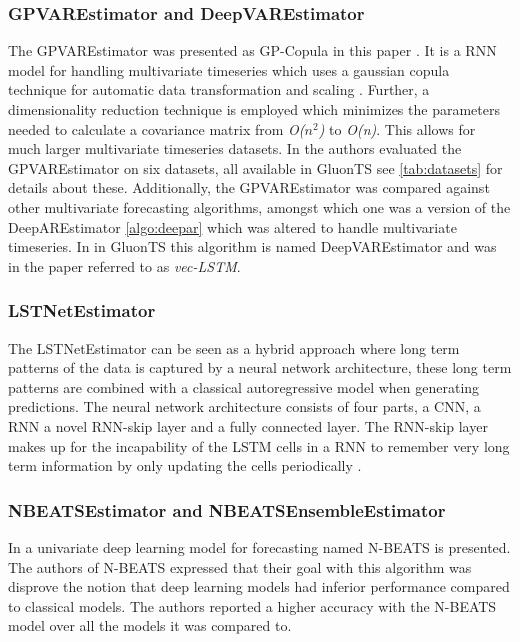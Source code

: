 \subsubsection{GPVAREstimator and DeepVAREstimator}
\label{algo:gpvar}
The GPVAREstimator was presented as GP-Copula in this paper \cite{salinas_high-dimensional_2019}. It is a RNN model for handling multivariate timeseries which uses a gaussian copula technique for automatic data transformation and scaling . Further, a dimensionality reduction technique is employed which minimizes the parameters needed to calculate a covariance matrix from \textit{O($n^2$)} to \textit{O(n)}. This allows for much larger multivariate timeseries datasets. In \cite{salinas_high-dimensional_2019} the authors evaluated the GPVAREstimator on six datasets, all available in GluonTS see \ref{tab:datasets} for details about these. Additionally, the GPVAREstimator was compared against other multivariate forecasting algorithms, amongst which one was a version of the DeepAREstimator \ref{algo:deepar} which was altered to handle multivariate timeseries. In in GluonTS this algorithm is named DeepVAREstimator and was in the paper referred to as \textit{vec-LSTM}. 

\subsubsection{LSTNetEstimator}
The LSTNetEstimator can be seen as a hybrid approach where long term patterns of the data is captured by a neural network architecture, these long term patterns are combined with a classical autoregressive model when generating predictions. The neural network architecture consists of four parts, a CNN, a RNN a novel RNN-skip layer and a fully connected layer. The RNN-skip layer makes up for the incapability of the LSTM cells in a RNN to remember very long term information by only updating the cells periodically \cite{lai_modeling_2018}.

\subsubsection{NBEATSEstimator and NBEATSEnsembleEstimator}
In \cite{oreshkin_n-beats_2020} a univariate deep learning model for forecasting named N-BEATS is presented. The authors of N-BEATS expressed that their goal with this algorithm was disprove the notion that deep learning models had inferior performance  compared to classical models. The authors reported a higher accuracy with the N-BEATS model over all the models it was compared to. 

